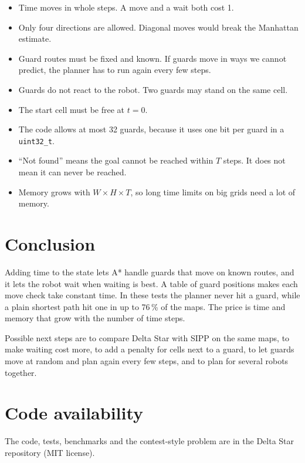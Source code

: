 \documentclass[10pt,letterpaper]{article}
\begin{document}
\begin{itemize}\setlength{\itemsep}{0pt}\setlength{\topsep}{2pt}
\item Time moves in whole steps. A move and a wait both cost 1.
\item Only four directions are allowed. Diagonal moves would break the Manhattan estimate.
\item Guard routes must be fixed and known. If guards move in ways we cannot predict, the planner has to run again every few steps.
\item Guards do not react to the robot. Two guards may stand on the same cell.
\item The start cell must be free at $t = 0$.
\item The code allows at most 32 guards, because it uses one bit per guard in a \texttt{uint32\_t}.
\item ``Not found'' means the goal cannot be reached within $T$ steps. It does not mean it can never be reached.
\item Memory grows with $W \times H \times T$, so long time limits on big grids need a lot of memory.
\end{itemize}

\section{Conclusion}

Adding time to the state lets A* handle guards that move on known routes, and it lets the robot wait when waiting is best. A table of guard positions makes each move check take constant time. In these tests the planner never hit a guard, while a plain shortest path hit one in up to 76\,\% of the maps. The price is time and memory that grow with the number of time steps.

Possible next steps are to compare Delta Star with SIPP on the same maps, to make waiting cost more, to add a penalty for cells next to a guard, to let guards move at random and plan again every few steps, and to plan for several robots together.

\section*{Code availability}

The code, tests, benchmarks and the contest-style problem are in the Delta Star repository (MIT license).
\end{document}
